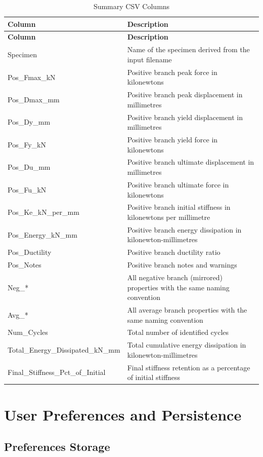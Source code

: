 \documentclass[11pt,a4paper]{article}
\begin{document}
\begin{longtable}{p{4cm}p{10cm}}
\caption{Summary CSV Columns}\label{tab:summary_csv}\\
\toprule
\textbf{Column} & \textbf{Description} \\
\midrule
\endfirsthead
\toprule
\textbf{Column} & \textbf{Description} \\
\midrule
\endhead
Specimen & Name of the specimen derived from the input filename \\
Pos\_Fmax\_kN & Positive branch peak force in kilonewtons \\
Pos\_Dmax\_mm & Positive branch peak displacement in millimetres \\
Pos\_Dy\_mm & Positive branch yield displacement in millimetres \\
Pos\_Fy\_kN & Positive branch yield force in kilonewtons \\
Pos\_Du\_mm & Positive branch ultimate displacement in millimetres \\
Pos\_Fu\_kN & Positive branch ultimate force in kilonewtons \\
Pos\_Ke\_kN\_per\_mm & Positive branch initial stiffness in kilonewtons per millimetre \\
Pos\_Energy\_kN\_mm & Positive branch energy dissipation in kilonewton-millimetres \\
Pos\_Ductility & Positive branch ductility ratio \\
Pos\_Notes & Positive branch notes and warnings \\
Neg\_* & All negative branch (mirrored) properties with the same naming convention \\
Avg\_* & All average branch properties with the same naming convention \\
Num\_Cycles & Total number of identified cycles \\
Total\_Energy\_Dissipated\_kN\_mm & Total cumulative energy dissipation in kilonewton-millimetres \\
Final\_Stiffness\_Pct\_of\_Initial & Final stiffness retention as a percentage of initial stiffness \\
\bottomrule
\end{longtable}

\section{User Preferences and Persistence}

\subsection{Preferences Storage}
\end{document}
